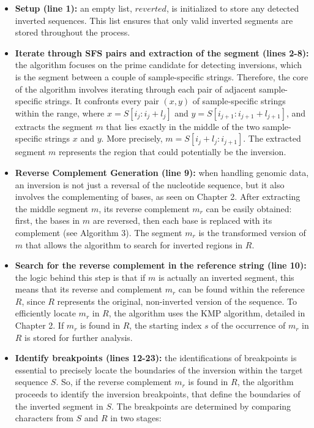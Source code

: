 \begin{itemize}
    \item \textbf{Setup (line 1):} 
     an empty list, \( reverted \), is initialized to store any detected inverted sequences. This list ensures that only valid inverted segments are stored throughout the process.
    \item \textbf{Iterate through SFS pairs and extraction of the segment (lines 2-8):} the algorithm focuses on the prime candidate for detecting inversions, which is the segment between a couple of sample-specific strings. Therefore, the core of the algorithm involves iterating through each pair of adjacent sample-specific strings. It confronts every pair \( (x, y) \) of sample-specific strings within the range, where \( x = S[i_j : i_j + l_j] \) and \( y = S[i_{j+1} : i_{j+1} + l_{j+1}] \), and extracts the segment \( m \) that lies exactly in the middle of the two sample-specific strings \( x \) and \( y \). More precisely, \( m = S[i_j + l_j : i_{j+1}] \). The extracted segment \( m \) represents the region that could potentially be the inversion.
    \item \textbf{Reverse Complement Generation (line 9):} when handling genomic data, an inversion is not just a reversal of the nucleotide sequence, but it also involves the complementing of bases, as seen on Chapter 2. After extracting the middle segment \( m \), its reverse complement \( m_r \) can be easily obtained: first, the bases in \( m \) are reversed, then each base is replaced with its complement (see Algorithm 3). The segment \( m_r \) is the transformed version of \( m \) that allows the algorithm to search for inverted regions in \( R \). 
    \item \textbf{Search for the reverse complement in the reference string (line 10): } the logic behind this step is that if \( m \) is actually an inverted segment, this means that its reverse and complement \( m_r \) can be found within the reference \( R \), since \( R \) represents the original, non-inverted version of the sequence. To efficiently locate \( m_r \) in \( R \), the algorithm uses the KMP algorithm, detailed in Chapter 2. If \( m_r \) is found in \( R \), the starting index \( s \) of the occurrence of \( m_r \) in \( R \) is stored for further analysis. 
    \item \textbf{Identify breakpoints (lines 12-23): } the identifications of breakpoints is essential to precisely locate the boundaries of the inversion within the target sequence \( S \). So, if the reverse complement \( m_r \) is found in \( R \), the algorithm proceeds to identify the inversion breakpoints, that define the boundaries of the inverted segment in \( S \). The breakpoints are determined by comparing characters from \( S \) and \( R \) in two stages:

\end{itemize}
